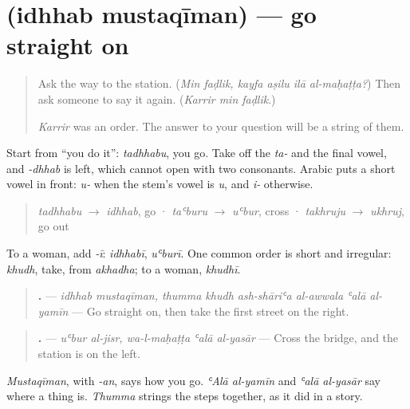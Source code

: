\section[\texorpdfstring{\ar{اذهب} \ar{مستقيما} (idhhab mustaqīman)}{اذهب مستقيما (idhhab mustaqīman)}]{  (idhhab mustaqīman) — go straight on}

\label{lesson:AR-C287-idhhab}



\begin{quote}
Ask the way to the station. (\emph{Min faḍlik, kayfa aṣilu ilā al-maḥaṭṭa?}) Then ask someone to say it again. (\emph{Karrir min faḍlik}.)

\emph{Karrir} was an order. The answer to your question will be a string of them.
\end{quote}

\begin{grammarlens}[title={Grammar Lens: an order from the present}]
Start from \textquotedblleft{}you do it\textquotedblright{}: \emph{tadhhabu}, you go. Take off the \emph{ta-} and the final vowel, and \emph{-dhhab} is left, which cannot open with two consonants. Arabic puts a short vowel in front: \emph{u-} when the stem's vowel is \emph{u}, and \emph{i-} otherwise.

\begin{quote}
\emph{tadhhabu} $\to$ \textbf{} \emph{idhhab}, go · \emph{taʿburu} $\to$ \textbf{} \emph{uʿbur}, cross · \emph{takhruju} $\to$ \textbf{} \emph{ukhruj}, go out
\end{quote}

To a woman, add \emph{-ī}: \emph{idhhabī}, \emph{uʿburī}. One common order is short and irregular: \textbf{} \emph{khudh}, take, from \emph{akhadha}; to a woman, \emph{khudhī}.
\end{grammarlens}

\begin{grammarlens}[title={Grammar Lens: the way, in orders}]
\begin{quote}
\textbf{       .} — \emph{idhhab mustaqīman, thumma khudh ash-shāriʿa al-awwala ʿalā al-yamīn} — Go straight on, then take the first street on the right.
\end{quote}

\begin{quote}
\textbf{    .} — \emph{uʿbur al-jisr, wa-l-maḥaṭṭa ʿalā al-yasār} — Cross the bridge, and the station is on the left.
\end{quote}

\emph{Mustaqīman}, with \emph{-an}, says how you go. \emph{ʿAlā al-yamīn} and \emph{ʿalā al-yasār} say where a thing is. \emph{Thumma} strings the steps together, as it did in a story.
\end{grammarlens}


